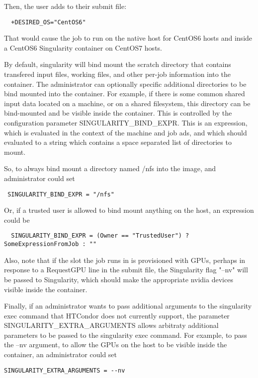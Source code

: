 Then, the user adds to their submit file:

\begin{verbatim}
  +DESIRED_OS="CentOS6"
\end{verbatim}

That would cause the job to run on the native host for CentOS6 hosts
and inside a CentOS6 Singularity container on CentOS7 hosts.

By default, singularity will bind mount the scratch directory that contains transfered input files, 
working files, and other per-job information into the container.  The administrator can optionally
specific additional directories to be bind mounted into the container.  For example, if there is some common
shared input data located on a machine, or on a shared filesystem, this directory can be bind-mounted 
and be visible inside the container.  This is controlled by the configuration parameter
SINGULARITY\_BIND\_EXPR.  This is an expression, which is evaluated in the context of the machine and job ads,
and which should evaluated to a string which contains a space separated list of directories to mount.

So, to always bind mount a directory named /nfs into the image, and administrator could set
\begin{verbatim}
 SINGULARITY_BIND_EXPR = "/nfs"
\end{verbatim}

Or, if a trusted user is allowed to bind mount anything on the host, an expression could be
\begin{verbatim}
  SINGULARITY_BIND_EXPR = (Owner == "TrustedUser") ? SomeExpressionFromJob : ""
\end{verbatim}

Also, note that if the slot the job runs in is provisioned with GPUs, perhaps
in response to a RequestGPU line in the submit file, the Singularity flag
"--nv" will be passed to Singularity, which should make the appropriate
nvidia devices visible inside the container.

Finally, if an administrator wants to pass additional arguments to the singularity exec command that HTCondor
does not currently support, the parameter SINGULARITY\_EXTRA\_ARGUMENTS allows arbitraty additional parameters
to be passed to the singularity exec command.  For example, to pass the --nv argument, to allow the GPUs on the
host to be visible inside the container, an administrator could set

\begin{verbatim}
SINGULARITY_EXTRA_ARGUMENTS = --nv
\end{verbatim}
